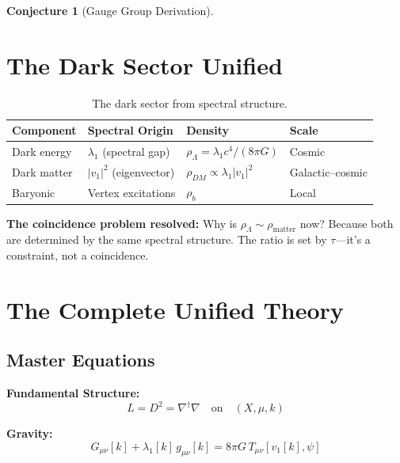 \documentclass[11pt,a4paper]{article}
\theoremstyle{plain}
\theoremstyle{definition}
\newtheorem{conjecture}[theorem]{Conjecture}
\theoremstyle{remark}
\begin{document}
\begin{conjecture}[Gauge Group Derivation]
\section{The Dark Sector Unified}

\begin{table}[H]
\centering
\begin{tabular}{@{}llll@{}}
\toprule
\textbf{Component} & \textbf{Spectral Origin} & \textbf{Density} & \textbf{Scale} \\
\midrule
Dark energy & $\lambda_1$ (spectral gap) & $\rho_\Lambda = \lambda_1 c^4/(8\pi G)$ & Cosmic \\
Dark matter & $|v_1|^2$ (eigenvector) & $\rho_{DM} \propto \lambda_1|v_1|^2$ & Galactic--cosmic \\
Baryonic & Vertex excitations & $\rho_b$ & Local \\
\bottomrule
\end{tabular}
\caption{The dark sector from spectral structure.}
\end{table}

\textbf{The coincidence problem resolved:} Why is $\rho_\Lambda \sim \rho_{\text{matter}}$ now? Because both are determined by the same spectral structure. The ratio is set by $\tau$---it's a constraint, not a coincidence.

\section{The Complete Unified Theory}

\subsection{Master Equations}

\begin{keyresult}
\textbf{Fundamental Structure:}
\begin{equation}
L = D^2 = \nabla^\dagger\nabla \quad \text{on} \quad (X, \mu, k)
\end{equation}

\textbf{Gravity:}
\begin{equation}
G_{\mu\nu}[k] + \lambda_1[k]\, g_{\mu\nu}[k] = 8\pi G\, T_{\mu\nu}[v_1[k], \psi]
\end{equation}


\end{keyresult}
\end{conjecture}
\end{document}
